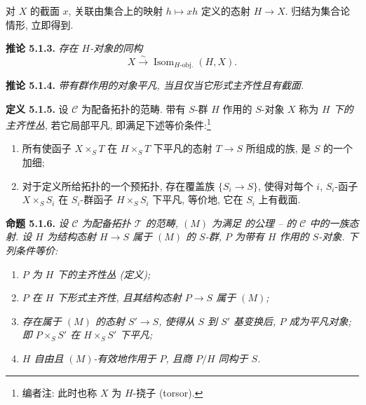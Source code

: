 对 \(X\) 的截面 \(x\), 关联由集合上的映射 \(h\mapsto xh\) 定义的态射
\(H\to X\). 归结为集合论情形, 立即得到.

\medskip
\noindent{}\textbf{推论 5.1.3.}
\textit{存在 \(H\)-对象的同构}
\[
  X\xrightarrow{\sim}\operatorname{Isom}_{H\text{-obj.}}(H,X).
\]

\medskip
\noindent{}\textbf{推论 5.1.4.}
\textit{带有群作用的对象平凡, 当且仅当它形式主齐性且有截面.}

\medskip
\noindent{}\textbf{定义 5.1.5.}
设 \(\mathscr C\) 为配备拓扑的范畴.
带有 \(S\)-群 \(H\) 作用的 \(S\)-对象 \(X\) 称为
\emph{\(H\) 下的主齐性丛}, 若它局部平凡, 即满足下述等价条件:\footnote{编者注: 此时也称 \(X\) 为 \(H\)-挠子 (torsor).}
\begin{enumerate}
  \item[(i)] 所有使函子 \(X\times_ST\) 在 \(H\times_ST\) 下平凡的态射
\(T\to S\) 所组成的族, 是 \(S\) 的一个加细;
  \item[(ii)] 对于定义所给拓扑的一个预拓扑, 存在覆盖族 \(\{S_i\to S\}\),
使得对每个 \(i\), \(S_i\)-函子 \(X\times_SS_i\) 在 \(S_i\)-群函子
\(H\times_SS_i\) 下平凡, 等价地, 它在 \(S_i\) 上有截面.
\end{enumerate}


\medskip
\noindent{}\textbf{命题 5.1.6.}
\textit{设 \(\mathscr C\) 为配备拓扑 \(\mathcal T\) 的范畴,
\((M)\) 为满足 的公理
--
的 \(\mathscr C\) 中的一族态射.
设 \(H\) 为结构态射 \(H\to S\) 属于 \((M)\) 的 \(S\)-群,
\(P\) 为带有 \(H\) 作用的 \(S\)-对象. 下列条件等价:}
\begin{enumerate}
  \item[(i)] \textit{\(P\) 为 \(H\) 下的主齐性丛
(定义);}
  \item[(ii)] \textit{\(P\) 在 \(H\) 下形式主齐性, 且其结构态射 \(P\to S\) 属于 \((M)\);}
  \item[(iii)] \textit{存在属于 \((M)\) 的态射 \(S'\to S\), 使得从 \(S\) 到 \(S'\)
基变换后, \(P\) 成为平凡对象; 即 \(P\times_SS'\) 在 \(H\times_SS'\) 下平凡;}
  \item[(iv)] \textit{\(H\) 自由且 \((M)\)-有效地作用于 \(P\), 且商 \(P/H\) 同构于 \(S\).}
\end{enumerate}

